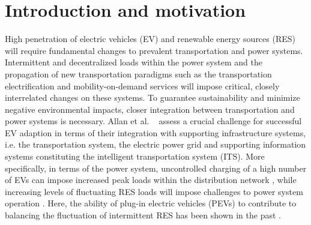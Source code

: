 \section{Introduction and motivation}



High penetration of electric vehicles (EV) and renewable energy sources (RES) will require fundamental changes to prevalent transportation and power systems. Intermittent and decentralized loads within the power system and the propagation of new transportation paradigms such as the transportation electrification and mobility-on-demand services will impose critical, closely interrelated changes on these systems.
To guarantee sustainability and minimize negative environmental impacts, closer integration between transportation and power systems is necessary. Allan et al. ~\cite{allan2015benchmark} assess a crucial challenge for successful EV adaption in terms of their integration with supporting infrastructure systems, i.e. the transportation system, the electric power grid and supporting information systems constituting the intelligent transportation system (ITS). 
More specifically, in terms of the power system, uncontrolled charging of a high number of EVs can impose increased peak loads within the distribution network \cite{lopes2009identifying}, while increasing levels of fluctuating RES loads will impose challenges to power system operation \cite{heussen2012unified}. 
Here, the ability of plug-in electric vehicles (PEVs) to contribute to balancing the fluctuation of intermittent RES has been shown in the past \cite{dallinger2012grid}. 


